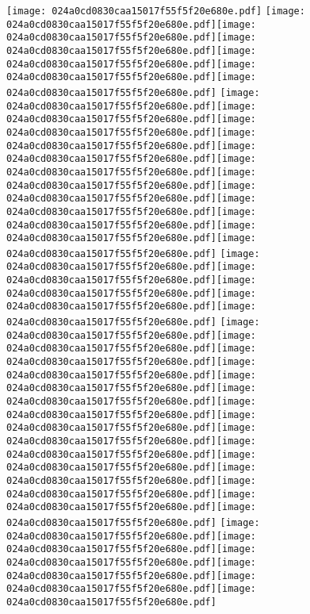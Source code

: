 \documentclass{article}
\newcommand{\origpg}[2]{\texttt{[image: 024a0cd0830caa15017f55f5f20e680e.pdf]}}
\begin{document}
{\vspace{28.908pt} \hspace{31.403pt}\origpg{12}{120.74pt 644.6pt 131.51pt 660.74pt} \origpg{12}{148.2pt 644.6pt 156.42pt 660.74pt}\hspace{-0.258pt}\origpg{12}{156.16pt 644.6pt 163.33pt 660.74pt}\origpg{12}{163.38pt 644.6pt 172.01pt 660.74pt}\origpg{12}{172.01pt 644.6pt 180.65pt 660.74pt}\origpg{12}{180.71pt 644.6pt 188.78pt 660.74pt}\hspace{-0.355pt}\origpg{12}{188.43pt 644.6pt 198.64pt 660.74pt} \origpg{12}{214.95pt 644.6pt 221.88pt 660.74pt}\hspace{-0.178pt}\origpg{12}{221.7pt 644.6pt 229.54pt 660.74pt}\hspace{-0.371pt}\origpg{12}{229.17pt 644.6pt 236.34pt 660.74pt}\origpg{12}{236.39pt 644.6pt 245.02pt 660.74pt}\origpg{12}{245.02pt 644.6pt 252.19pt 660.74pt}\hspace{-0.145pt}\origpg{12}{252.04pt 644.6pt 260.11pt 660.74pt}\hspace{-0.113pt}\origpg{12}{260pt 644.6pt 268.64pt 660.74pt}\origpg{12}{268.64pt 644.6pt 278.85pt 660.74pt}\origpg{12}{278.79pt 644.6pt 285.95pt 660.74pt}\hspace{-0.178pt}\origpg{12}{285.78pt 644.6pt 294.41pt 660.74pt}\origpg{12}{294.41pt 644.6pt 301.47pt 660.74pt}\origpg{12}{301.47pt 644.6pt 308.63pt 660.74pt} \origpg{12}{325.03pt 644.6pt 333.25pt 660.74pt}\hspace{-0.742pt}\origpg{12}{332.5pt 644.6pt 340.57pt 660.74pt}\hspace{-1.324pt}\origpg{12}{339.25pt 644.6pt 347.46pt 660.74pt}\hspace{0.194pt}\origpg{12}{347.66pt 644.6pt 354.82pt 660.74pt}\hspace{-0.178pt}\origpg{12}{354.65pt 644.6pt 361.7pt 660.74pt} \origpg{12}{378.47pt 644.6pt 386.54pt 660.74pt}\hspace{-0.113pt}\origpg{12}{386.43pt 644.6pt 393.59pt 660.74pt}\origpg{12}{393.64pt 644.6pt 400.81pt 660.74pt}\hspace{-0.178pt}\origpg{12}{400.63pt 644.6pt 407.8pt 660.74pt}\origpg{12}{407.85pt 644.6pt 418.06pt 660.74pt}\origpg{12}{417.97pt 644.6pt 425.13pt 660.74pt}\hspace{-0.42pt}\origpg{12}{424.71pt 644.6pt 431.77pt 660.74pt}\origpg{12}{431.7pt 644.6pt 439.77pt 660.74pt}\origpg{12}{439.87pt 644.6pt 448.5pt 660.74pt}\hspace{-0.21pt}\origpg{12}{448.29pt 644.6pt 455.91pt 660.74pt}\hspace{-0.145pt}\origpg{12}{455.77pt 644.6pt 462.93pt 660.74pt}\hspace{-0.42pt}\origpg{12}{462.51pt 644.6pt 469.57pt 660.74pt}\origpg{12}{469.5pt 644.6pt 476.86pt 660.74pt}\hspace{-0.129pt}\origpg{12}{476.73pt 644.6pt 483.9pt 660.74pt}\origpg{12}{483.95pt 644.6pt 491.37pt 660.74pt} \origpg{12}{507.79pt 644.6pt 514.95pt 660.74pt}\origpg{12}{515pt 644.6pt 523.06pt 660.74pt}\origpg{12}{522.96pt 644.6pt 531.03pt 660.74pt}\hspace{-0.355pt}\origpg{12}{530.67pt 644.6pt 538.79pt 660.74pt}\origpg{12}{538.84pt 644.6pt 546.01pt 660.74pt}\origpg{12}{546.06pt 644.6pt 554.69pt 660.74pt} 

}
\end{document}
